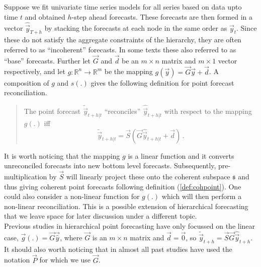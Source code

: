 \documentclass[graybox]{svmult}
\begin{document}
Suppose we fit univariate time series models for all series based on data upto time $t$ and obtained $h$-step ahead forecasts. These forecasts are then formed in a vector $\hat{\vec{y}}_{T+h}$ by stacking the forecasts at each node in the same order as $\vec{y}_{t}$. Since these do not satisfy the aggregate constraints of the hierarchy, they are often referred to as ``incoherent'' forecasts. In some texts these also referred to as ``base'' forecasts. Further let $\vec{G}$ and $\vec{d}$ be an $m\times n$ matrix and $m\times 1$ vector respectively, and let $g:\mathbb{R}^n \rightarrow \mathbb{R}^m$ be the mapping $g(\vec{y})=\vec{G}\vec{y}+\vec{d}$.  A composition of $g$ and $s(.)$ gives the following definition for point forecast reconciliation.

\begin{quotation}
\begin{definition}\label{def:reconpoint}
	\item[] The point forecast $\tilde{\vec{y}}_{t+h|t}$ ``reconciles'' $\hat{\vec{y}}_{t+h|t}$ with respect to the mapping $g(.)$ iff
	\begin{equation}
	\tilde{\vec{y}}_{t+h|t}=\vec{S}(\vec{G}\hat{\vec{y}}_{t+h|t}+\vec{d})\,.
	\end{equation}
\end{definition}
\end{quotation}

It is worth noticing that the mapping $g$ is a linear function and it converts unreconciled forecasts into new bottom level forecasts. Subsequently, pre-multiplication by $\vec{S}$ will linearly project these onto the coherent subspace $\mathfrak{s}$ and thus giving coherent point forecasts following definition (\ref{def:cohpoint}). 
One could also consider a non-linear function for $g(.)$ which will then perform a non-linear reconciliation. This is a possible extension of hierarchical forecasting that we leave space for later discussion under a different topic.\\

Previous studies in hierarchical point forecasting have only focussed on the linear case,  $\vec{g}(.) = \vec{G}\vec{\hat{y}}$, where $\vec{G}$ is an $m \times n$ matrix and $\vec{d}=\vec{0}$, so $\tilde{\vec{y}}_{t+h}=\vec{S}\vec{G} \hat{\vec{y}}_{t+h}$. It should also worth noticing that in almost all past studies have used the notation $\vec{P}$ for which we use $\vec{G}$. \\
\end{document}
